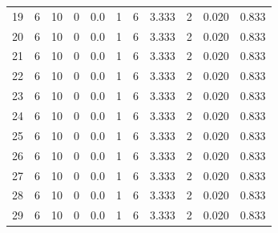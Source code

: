 \documentclass{article}
\theoremstyle{definition}
\begin{document}
\begin{table}[!hbtp]
{\begin{tabular}{lrrrrrrrrrr}
            19 &        6 &       10 &                 0 &               0.0 &                       1 &                          6 &       3.333 &              2 &       0.020 &             0.833 \\
            20 &        6 &       10 &                 0 &               0.0 &                       1 &                          6 &       3.333 &              2 &       0.020 &             0.833 \\
            21 &        6 &       10 &                 0 &               0.0 &                       1 &                          6 &       3.333 &              2 &       0.020 &             0.833 \\
            22 &        6 &       10 &                 0 &               0.0 &                       1 &                          6 &       3.333 &              2 &       0.020 &             0.833 \\
            23 &        6 &       10 &                 0 &               0.0 &                       1 &                          6 &       3.333 &              2 &       0.020 &             0.833 \\
            24 &        6 &       10 &                 0 &               0.0 &                       1 &                          6 &       3.333 &              2 &       0.020 &             0.833 \\
            25 &        6 &       10 &                 0 &               0.0 &                       1 &                          6 &       3.333 &              2 &       0.020 &             0.833 \\
            26 &        6 &       10 &                 0 &               0.0 &                       1 &                          6 &       3.333 &              2 &       0.020 &             0.833 \\
            27 &        6 &       10 &                 0 &               0.0 &                       1 &                          6 &       3.333 &              2 &       0.020 &             0.833 \\
            28 &        6 &       10 &                 0 &               0.0 &                       1 &                          6 &       3.333 &              2 &       0.020 &             0.833 \\
            29 &        6 &       10 &                 0 &               0.0 &                       1 &                          6 &       3.333 &              2 &       0.020 &             0.833 \\

\end{tabular}}
\end{table}
\end{document}
